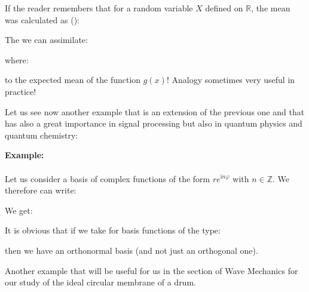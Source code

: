 	\begin{tcolorbox}[title=Remark,colframe=black,arc=10pt]
	If the reader remembers that for a random variable $X$ defined on $\mathbb{R}$, the mean was calculated as ():
	
	The we can assimilate:
	
	where:
	
	to the expected mean of the function $g(x)$! Analogy sometimes very useful in practice!
	\end{tcolorbox}
	Let us see now another example that is an extension of the previous one and that has also a great importance in signal processing but also in quantum physics and quantum chemistry:
	\begin{tcolorbox}[colframe=black,colback=white,sharp corners]
	\textbf{{\Large {}}Example:}\\\\
	Let us consider a basis of complex functions of the form $r e^{\mathrm{i}n\varphi}$ with $n\in\mathbb{Z}$. We therefore can write:
	
	We get:
	
	It is obvious that if we take for basis functions of the type:
	
	then we have an orthonormal basis (and not just an orthogonal one).
	\end{tcolorbox}
	\label{orthogonality of bessel functions}
	Another example that will be useful for us in the section of Wave Mechanics for our study of the ideal circular membrane of a drum.
